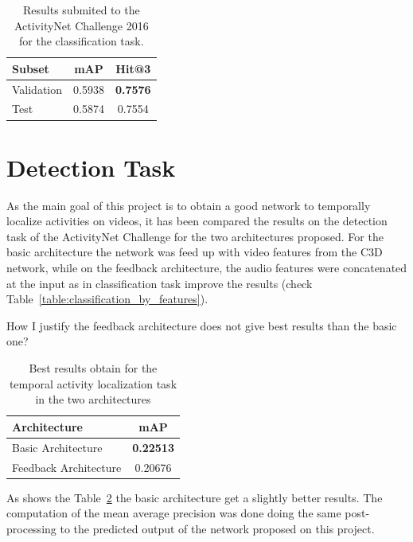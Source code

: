 \begin{table}[H]
\begin{center}
\begin{tabular}{|l|c|c|}
\hline
Subset & mAP & Hit@3 \\
\hline\hline
Validation & 0.5938 & \bf0.7576 \\
Test & 0.5874 & 0.7554 \\
\hline
\end{tabular}
\end{center}
\caption{Results submited to the ActivityNet Challenge 2016 for the classification task.}
\label{table:classification_results_challenge}
\end{table}



\section{Detection Task}

As the main goal of this project is to obtain a good network to temporally localize activities on videos, it has been compared the results on the detection task of the ActivityNet Challenge for the two architectures proposed. For the basic architecture the network was feed up with video features from the C3D network, while on the feedback architecture, the audio features were concatenated at the input as in classification task improve the results (check Table~\ref{table:classification_by_features}).

How I justify the feedback architecture does not give best results than the basic one?

\begin{table}[H]
\begin{center}
\begin{tabular}{|l|c|}
\hline
Architecture & mAP \\
\hline\hline
Basic Architecture & \bf0.22513 \\
Feedback Architecture & 0.20676 \\
\hline
\end{tabular}
\end{center}
\caption{Best results obtain for the temporal activity localization task in the two architectures}
\label{table:detection_architecture_comparison}
\end{table}

As shows the Table~\ref{table:detection_architecture_comparison} the basic architecture get a slightly better results. The computation of the mean average precision was done doing the same post-processing to the predicted output of the network proposed on this project.

